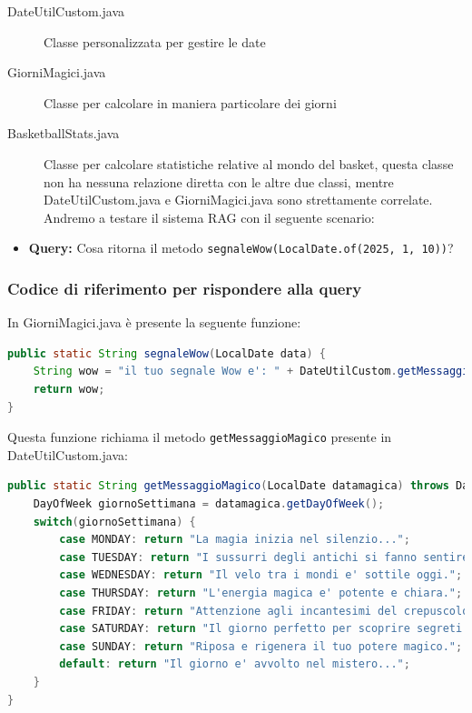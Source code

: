 \documentclass[12pt,a4paper,openright,twoside]{book}
\begin{document}
\begin{description}
    \item[DateUtilCustom.java] Classe personalizzata per gestire le date
    \item[GiorniMagici.java] Classe per calcolare in maniera particolare dei giorni
    \item[BasketballStats.java] Classe per calcolare statistiche relative al mondo del basket,
     questa classe non ha nessuna relazione diretta con le altre due classi, mentre DateUtilCustom.java e GiorniMagici.java sono strettamente correlate.
     Andremo a testare il sistema RAG con il seguente scenario: 
\end{description}

\begin{itemize}
    \item \textbf{Query:} Cosa ritorna il metodo \texttt{segnaleWow(LocalDate.of(2025, 1, 10))}?
\end{itemize}

\subsubsection{Codice di riferimento per rispondere alla query}
In GiorniMagici.java è presente la seguente funzione:

\begin{lstlisting}[language=Java, caption={Metodo segnaleWow in GiorniMagici.java}, label={lst:segnaleWow}]
public static String segnaleWow(LocalDate data) {
    String wow = "il tuo segnale Wow e': " + DateUtilCustom.getMessaggioMagico(date);
    return wow;
}
\end{lstlisting}

Questa funzione richiama il metodo \texttt{getMessaggioMagico} presente in DateUtilCustom.java:

\begin{lstlisting}[language=Java, caption={Metodo getMessaggioMagico in DateUtilCustom.java}, label={lst:getMessaggioMagico}]
public static String getMessaggioMagico(LocalDate datamagica) throws DateTimeParseException {
    DayOfWeek giornoSettimana = datamagica.getDayOfWeek();
    switch(giornoSettimana) {
        case MONDAY: return "La magia inizia nel silenzio...";
        case TUESDAY: return "I sussurri degli antichi si fanno sentire.";
        case WEDNESDAY: return "Il velo tra i mondi e' sottile oggi.";
        case THURSDAY: return "L'energia magica e' potente e chiara.";
        case FRIDAY: return "Attenzione agli incantesimi del crepuscolo.";
        case SATURDAY: return "Il giorno perfetto per scoprire segreti nascosti.";
        case SUNDAY: return "Riposa e rigenera il tuo potere magico.";
        default: return "Il giorno e' avvolto nel mistero...";
    }
}
\end{lstlisting}
\end{document}
